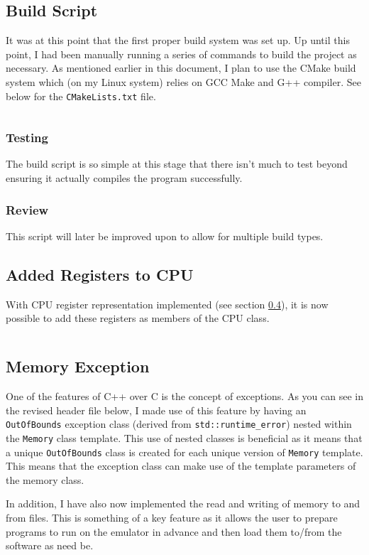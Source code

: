 \subsection{Build Script}
    It was at this point that the first proper build system was set up. Up until this point, I had been manually running a series of commands to build the project as necessary. As mentioned earlier in this document, I plan to use the CMake build system which (on my Linux system) relies on GCC Make and G++ compiler. See below for the \texttt{CMakeLists.txt} file.

    \inputminted{cmake}{code/CMakeLists.txt}

    \subsubsection{Testing}
        The build script is so simple at this stage that there isn't much to test beyond ensuring it actually compiles the program successfully.

    \subsubsection{Review}
        This script will later be improved upon to allow for multiple build types.

\subsection{Added Registers to CPU}
    With CPU register representation implemented (see section \ref{}), it is now possible to add these registers as members of the CPU class.

    \inputminted[linenos=false]{c++}{code/intel8086_registers.hpp}

\subsection{Memory Exception}
    One of the features of C++ over C is the concept of exceptions. As you can see in the revised header file below, I made use of this feature by having an \texttt{OutOfBounds} exception class (derived from \texttt{std::runtime\_error}) nested within the \texttt{Memory} class template. This use of nested classes is beneficial as it means that a unique \texttt{OutOfBounds} class is created for each unique version of \texttt{Memory} template. This means that the exception class can make use of the template parameters of the memory class.

    In addition, I have also now implemented the read and writing of memory to and from files. This is something of a key feature as it allows the user to prepare programs to run on the emulator in advance and then load them to/from the software as need be.

    \inputminted{c++}{code/memory_bruh.hpp}

\subsection{}
